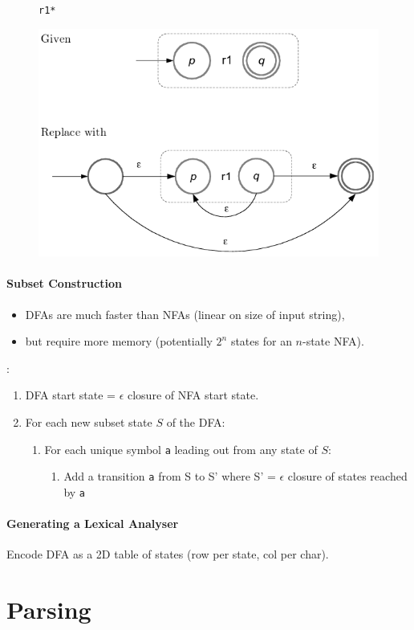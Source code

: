 \documentclass[twocolumn,english]{article}
\let\emph\relax
\begin{document}
\begin{figure}[H]
\begin{centering}
\texttt{r1{*}}
\par\end{centering}
\centering{}\includegraphics[width=0.5\linewidth]{img/repeat}
\end{figure}

\paragraph{Subset Construction}
\begin{itemize}
\item DFAs are much faster than NFAs (linear on size of input string), 
\item but require more memory (potentially $2^{n}$ states for an $n$-state
NFA).
\end{itemize}
\emph{Algorithm}:
\begin{enumerate}
\item DFA start state = $\epsilon$ closure of NFA start state.
\item For each new subset state $S$ of the DFA:
\begin{enumerate}
\item For each unique symbol \texttt{a} leading out from any state of $S$:
\begin{enumerate}
\item Add a transition \texttt{a} from S to S' where S' = $\epsilon$ closure
of states reached by \texttt{a}
\end{enumerate}
\end{enumerate}
\end{enumerate}

\paragraph{Generating a Lexical Analyser}

Encode DFA as a 2D table of states (row per state, col per char).

\section{Parsing}
\end{document}
